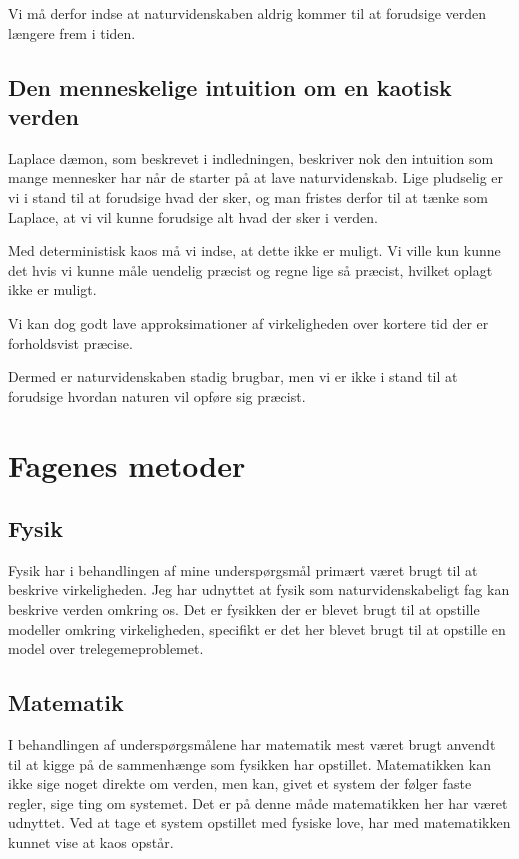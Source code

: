 \documentclass[12pt,a4paper]{article}
\theoremstyle{break}
\theoremstyle{nonumberplain}
\begin{document}
Vi må derfor indse at naturvidenskaben aldrig kommer til at forudsige verden længere frem i tiden. 

\subsection{Den menneskelige intuition om en kaotisk verden}
Laplace dæmon, som beskrevet i indledningen, beskriver nok den intuition som mange mennesker har når de starter på at lave naturvidenskab.
Lige pludselig er vi i stand til at forudsige hvad der sker, og man fristes derfor til at tænke som Laplace, at vi vil kunne forudsige alt hvad der sker i verden.

Med deterministisk kaos må vi indse, at dette ikke er muligt. 
Vi ville kun kunne det hvis vi kunne måle uendelig præcist og regne lige så præcist, hvilket oplagt ikke er muligt.

Vi kan dog godt lave approksimationer af virkeligheden over kortere tid der er forholdsvist præcise. 

Dermed er naturvidenskaben stadig brugbar, men vi er ikke i stand til at forudsige hvordan naturen vil opføre sig præcist.


\section{Fagenes metoder}
\subsection{Fysik}
Fysik har i behandlingen af mine underspørgsmål primært været brugt til at beskrive virkeligheden. 
Jeg har udnyttet at fysik som naturvidenskabeligt fag kan beskrive verden omkring os.
Det er fysikken der er blevet brugt til at opstille modeller omkring virkeligheden, specifikt er det her blevet brugt til at opstille en model over trelegemeproblemet.

\subsection{Matematik}
I behandlingen af underspørgsmålene har matematik mest været brugt anvendt til at kigge på de sammenhænge som fysikken har opstillet. 
Matematikken kan ikke sige noget direkte om verden, men kan, givet et system der følger faste regler, sige ting om systemet. 
Det er på denne måde matematikken her har været udnyttet. 
Ved at tage et system opstillet med fysiske love, har med matematikken kunnet vise at kaos opstår. 
\end{document}

